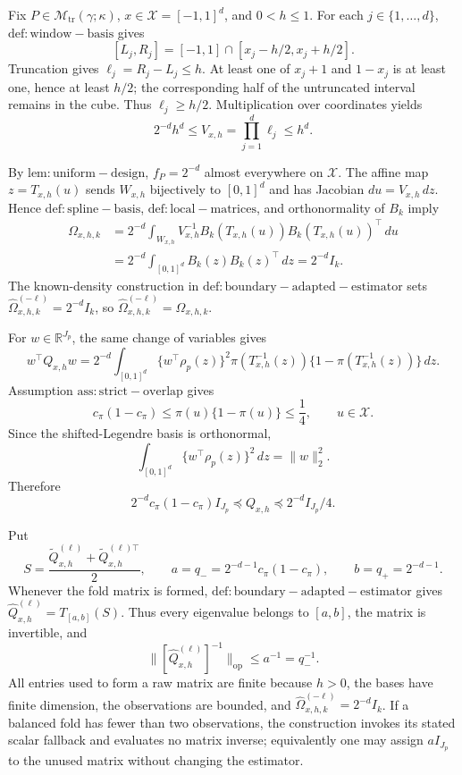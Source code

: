 Fix \(P\in\mathcal M_{\mathrm{tr}}(\gamma;\kappa)\), \(x\in\mathcal X=[-1,1]^d\), and \(0<h\le1\). For each \(j\in\{1,\ldots,d\}\), \(\mathrm{def:window-basis}\) gives
\[
[L_j,R_j]=[-1,1]\cap[x_j-h/2,x_j+h/2].
\]
Truncation gives \(\ell_j=R_j-L_j\le h\). At least one of \(x_j+1\) and \(1-x_j\) is at least one, hence at least \(h/2\); the corresponding half of the untruncated interval remains in the cube. Thus \(\ell_j\ge h/2\). Multiplication over coordinates yields
\[
2^{-d}h^d\le V_{x,h}=\prod_{j=1}^d\ell_j\le h^d.
\]

By \(\mathrm{lem:uniform-design}\), \(f_P=2^{-d}\) almost everywhere on \(\mathcal X\). The affine map \(z=T_{x,h}(u)\) sends \(W_{x,h}\) bijectively to \([0,1]^d\) and has Jacobian \(du=V_{x,h}\,dz\). Hence \(\mathrm{def:spline-basis}\), \(\mathrm{def:local-matrices}\), and orthonormality of \(B_k\) imply
\[
\begin{aligned}
\Omega_{x,h,k}
&=2^{-d}\int_{W_{x,h}}V_{x,h}^{-1}B_k(T_{x,h}(u))B_k(T_{x,h}(u))^\top\,du\\
&=2^{-d}\int_{[0,1]^d}B_k(z)B_k(z)^\top\,dz
=2^{-d}I_k.
\end{aligned}
\]
The known-density construction in \(\mathrm{def:boundary-adapted-estimator}\) sets \(\widehat\Omega^{(-\ell)}_{x,h,k}=2^{-d}I_k\), so \(\widehat\Omega^{(-\ell)}_{x,h,k}=\Omega_{x,h,k}\).

For \(w\in\mathbb R^{J_p}\), the same change of variables gives
\[
w^\top Q_{x,h}w
=2^{-d}\int_{[0,1]^d}\{w^\top\rho_p(z)\}^2
\pi(T_{x,h}^{-1}(z))\{1-\pi(T_{x,h}^{-1}(z))\}\,dz.
\]
Assumption \(\mathrm{ass:strict-overlap}\) gives
\[
c_\pi(1-c_\pi)\le\pi(u)\{1-\pi(u)\}\le\frac14,
\qquad u\in\mathcal X.
\]
Since the shifted-Legendre basis is orthonormal,
\[
\int_{[0,1]^d}\{w^\top\rho_p(z)\}^2\,dz=\lVert w\rVert_2^2.
\]
Therefore
\[
2^{-d}c_\pi(1-c_\pi)I_{J_p}
\preceq Q_{x,h}
\preceq2^{-d}I_{J_p}/4.
\]

Put
\[
S=\frac{\widetilde Q^{(\ell)}_{x,h}+\widetilde Q^{(\ell)\top}_{x,h}}2,
\qquad a=q_-=2^{-d-1}c_\pi(1-c_\pi),
\qquad b=q_+=2^{-d-1}.
\]
Whenever the fold matrix is formed, \(\mathrm{def:boundary-adapted-estimator}\) gives \(\widehat Q^{(\ell)}_{x,h}=T_{[a,b]}(S)\). Thus every eigenvalue belongs to \([a,b]\), the matrix is invertible, and
\[
\bigl\lVert[\widehat Q^{(\ell)}_{x,h}]^{-1}\bigr\rVert_{\mathrm{op}}
\le a^{-1}=q_-^{-1}.
\]
All entries used to form a raw matrix are finite because \(h>0\), the bases have finite dimension, the observations are bounded, and \(\widehat\Omega^{(-\ell)}_{x,h,k}=2^{-d}I_k\). If a balanced fold has fewer than two observations, the construction invokes its stated scalar fallback and evaluates no matrix inverse; equivalently one may assign \(aI_{J_p}\) to the unused matrix without changing the estimator.

